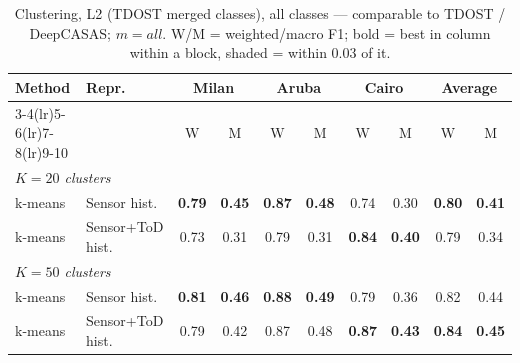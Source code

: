 \begin{table}[H]
\centering\small
\caption{Clustering, L2 (TDOST merged classes), all classes --- comparable to TDOST / DeepCASAS; $m=all$. W/M = weighted/macro F1; bold = best in column within a block, shaded = within 0.03 of it.}
\label{tab:clu_l2_all_mall}
\setlength{\tabcolsep}{3.5pt}
\begin{tabular}{llcc|cc|cc|cc}
\toprule
Method & Repr. & \multicolumn{2}{c}{Milan} & \multicolumn{2}{c}{Aruba} & \multicolumn{2}{c}{Cairo} & \multicolumn{2}{c}{Average} \\
\cmidrule(lr){3-4}\cmidrule(lr){5-6}\cmidrule(lr){7-8}\cmidrule(lr){9-10}
 & & W & M & W & M & W & M & W & M \\
\midrule
\multicolumn{10}{l}{\textit{$K = 20$ clusters}} \\
\midrule
k-means & Sensor hist. & \cellcolor{blue!12}\textbf{0.79} & \cellcolor{blue!12}\textbf{0.45} & \cellcolor{blue!12}\textbf{0.87} & \cellcolor{blue!12}\textbf{0.48} & 0.74 & 0.30 & \cellcolor{blue!12}\textbf{0.80} & \cellcolor{blue!12}\textbf{0.41} \\
k-means & Sensor+ToD hist. & 0.73 & 0.31 & 0.79 & 0.31 & \cellcolor{blue!12}\textbf{0.84} & \cellcolor{blue!12}\textbf{0.40} & \cellcolor{blue!12}0.79 & 0.34 \\
\midrule
\multicolumn{10}{l}{\textit{$K = 50$ clusters}} \\
\midrule
k-means & Sensor hist. & \cellcolor{blue!12}\textbf{0.81} & \cellcolor{blue!12}\textbf{0.46} & \cellcolor{blue!12}\textbf{0.88} & \cellcolor{blue!12}\textbf{0.49} & 0.79 & 0.36 & \cellcolor{blue!12}0.82 & \cellcolor{blue!12}0.44 \\
k-means & Sensor+ToD hist. & \cellcolor{blue!12}0.79 & 0.42 & \cellcolor{blue!12}0.87 & \cellcolor{blue!12}0.48 & \cellcolor{blue!12}\textbf{0.87} & \cellcolor{blue!12}\textbf{0.43} & \cellcolor{blue!12}\textbf{0.84} & \cellcolor{blue!12}\textbf{0.45} \\
\bottomrule
\end{tabular}
\end{table}
